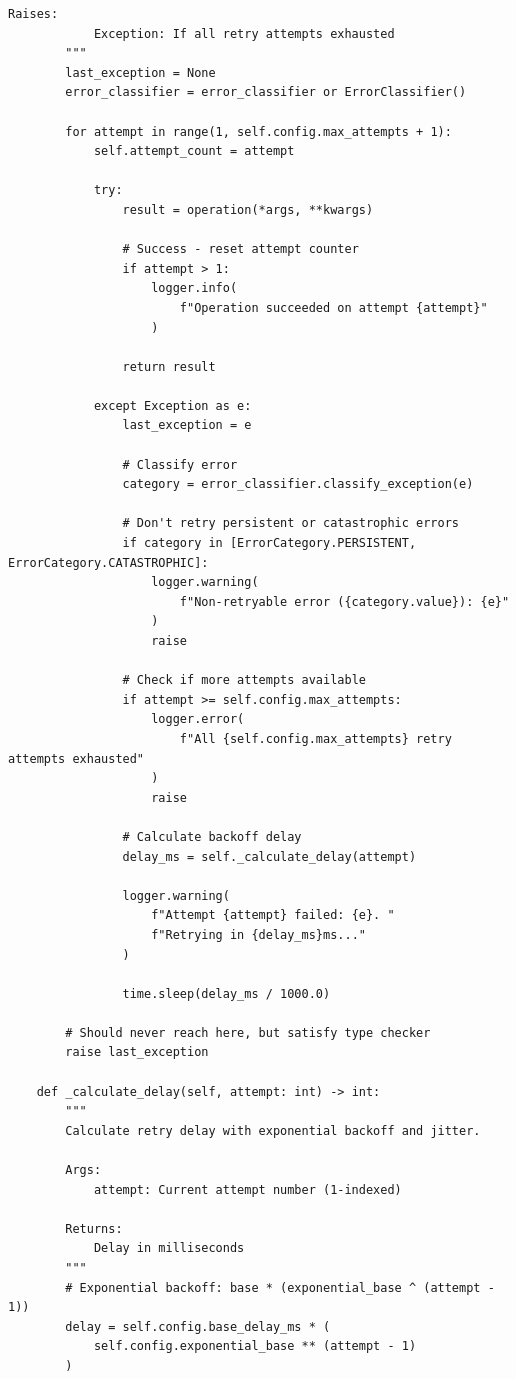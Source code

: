 \begin{lstlisting}[style=python, caption={Production Retry Strategy}]
        Raises:
            Exception: If all retry attempts exhausted
        """
        last_exception = None
        error_classifier = error_classifier or ErrorClassifier()

        for attempt in range(1, self.config.max_attempts + 1):
            self.attempt_count = attempt

            try:
                result = operation(*args, **kwargs)

                # Success - reset attempt counter
                if attempt > 1:
                    logger.info(
                        f"Operation succeeded on attempt {attempt}"
                    )

                return result

            except Exception as e:
                last_exception = e

                # Classify error
                category = error_classifier.classify_exception(e)

                # Don't retry persistent or catastrophic errors
                if category in [ErrorCategory.PERSISTENT, ErrorCategory.CATASTROPHIC]:
                    logger.warning(
                        f"Non-retryable error ({category.value}): {e}"
                    )
                    raise

                # Check if more attempts available
                if attempt >= self.config.max_attempts:
                    logger.error(
                        f"All {self.config.max_attempts} retry attempts exhausted"
                    )
                    raise

                # Calculate backoff delay
                delay_ms = self._calculate_delay(attempt)

                logger.warning(
                    f"Attempt {attempt} failed: {e}. "
                    f"Retrying in {delay_ms}ms..."
                )

                time.sleep(delay_ms / 1000.0)

        # Should never reach here, but satisfy type checker
        raise last_exception

    def _calculate_delay(self, attempt: int) -> int:
        """
        Calculate retry delay with exponential backoff and jitter.

        Args:
            attempt: Current attempt number (1-indexed)

        Returns:
            Delay in milliseconds
        """
        # Exponential backoff: base * (exponential_base ^ (attempt - 1))
        delay = self.config.base_delay_ms * (
            self.config.exponential_base ** (attempt - 1)
        )


\end{lstlisting}
